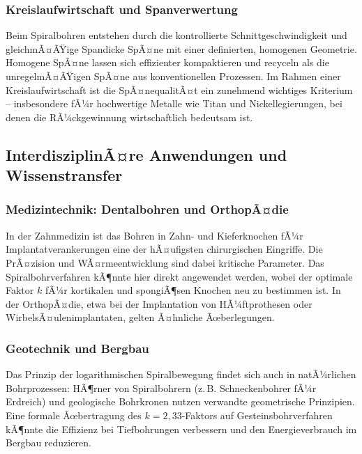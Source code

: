 ﻿\documentclass[12pt,a4paper]{article}
\begin{document}
\subsubsection{Kreislaufwirtschaft und Spanverwertung}

Beim Spiralbohren entstehen durch die kontrollierte Schnittgeschwindigkeit und gleichmÃ¤ÃŸige Spandicke SpÃ¤ne mit einer definierten, homogenen Geometrie. Homogene SpÃ¤ne lassen sich effizienter kompaktieren und recyceln als die unregelmÃ¤ÃŸigen SpÃ¤ne aus konventionellen Prozessen. Im Rahmen einer Kreislaufwirtschaft ist die SpÃ¤nequalitÃ¤t ein zunehmend wichtiges Kriterium -- insbesondere fÃ¼r hochwertige Metalle wie Titan und Nickellegierungen, bei denen die RÃ¼ckgewinnung wirtschaftlich bedeutsam ist.

\subsection{InterdisziplinÃ¤re Anwendungen und Wissenstransfer}

\subsubsection{Medizintechnik: Dentalbohren und OrthopÃ¤die}

In der Zahnmedizin ist das Bohren in Zahn- und Kieferknochen fÃ¼r Implantatverankerungen eine der hÃ¤ufigsten chirurgischen Eingriffe. Die PrÃ¤zision und WÃ¤rmeentwicklung sind dabei kritische Parameter. Das Spiralbohrverfahren kÃ¶nnte hier direkt angewendet werden, wobei der optimale Faktor $k$ fÃ¼r kortikalen und spongiÃ¶sen Knochen neu zu bestimmen ist. In der OrthopÃ¤die, etwa bei der Implantation von HÃ¼ftprothesen oder WirbelsÃ¤ulenimplantaten, gelten Ã¤hnliche Ãœberlegungen.

\subsubsection{Geotechnik und Bergbau}

Das Prinzip der logarithmischen Spiralbewegung findet sich auch in natÃ¼rlichen Bohrprozessen: HÃ¶rner von Spiralbohrern (z.\,B. Schneckenbohrer fÃ¼r Erdreich) und geologische Bohrkronen nutzen verwandte geometrische Prinzipien. Eine formale Ãœbertragung des $k = 2{,}33$-Faktors auf Gesteinsbohrverfahren kÃ¶nnte die Effizienz bei Tiefbohrungen verbessern und den Energieverbrauch im Bergbau reduzieren.
\end{document}
